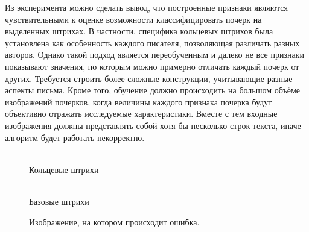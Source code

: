\documentclass{article}
\begin{document}
Из эксперимента можно сделать вывод, что построенные признаки являются чувствительными к оценке возможности классифицировать почерк на выделенных штрихах. В частности, специфика кольцевых штрихов была установлена как особенность каждого писателя, позволяющая различать разных авторов. Однако такой подход является переобученным и далеко не все признаки показывают значения, по которым можно примерно отличать каждый почерк от других. Требуется строить более сложные конструкции, учитывающие разные аспекты письма. Кроме того, обучение должно происходить на большом объёме изображений почерков, когда величины каждого признака почерка будут объективно отражать исследуемые характеристики. Вместе с тем входные изображения должны представлять собой хотя бы несколько строк текста, иначе алгоритм будет работать некорректно.

\begin{figure}[h]
\begin{minipage}[h]{1\linewidth}
 \\ Кольцевые штрихи
\end{minipage}
\vfill
\begin{minipage}[h]{1\linewidth}
 \\ Базовые штрихи
\end{minipage}
\caption{Изображение, на котором происходит ошибка.}
\end{figure}




\end{document}
